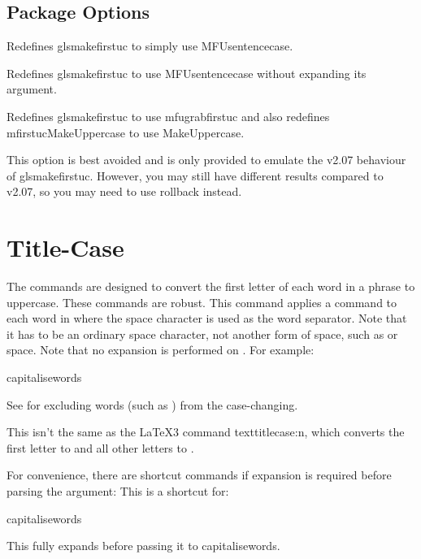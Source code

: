 \documentclass[titlepage=false,oneside,
 fontsize=12pt,captions=tableheading]{scrbook}
\begin{document}
\section{Package Options}
\label{sec:pkgoptions}

Redefines \gls{glsmakefirstuc} to simply use \gls{MFUsentencecase}.

Redefines \gls{glsmakefirstuc} to use \gls{MFUsentencecase}
without expanding its argument.

Redefines \gls{glsmakefirstuc} to use \gls{mfugrabfirstuc} and also
redefines \gls{mfirstucMakeUppercase} to use \gls{MakeUppercase}.

This option is best avoided and is only provided to emulate the v2.07
behaviour of \gls{glsmakefirstuc}. However, you may still have
different results compared to v2.07, so you may need to use rollback
instead.

\chapter{Title-Case}
\label{sec:capitalisewords}

The  commands are designed to convert the first letter of each
word in a phrase to uppercase. These commands are robust.
This command applies a  command to each word in 
where the space character is used as the word separator. Note that
it has to be an ordinary space character, not another form of space,
such as  or \gls{space}. Note that no expansion is performed
on .
For example:
\begin{coderesult}
\gls{capitalisewords}
\tcblower
{}
\end{coderesult}
See  for excluding words (such as )
from the case-changing.

\begin{information}
This isn't the same as the \LaTeX3 command \gls{texttitlecase:n},
which converts the first letter to  and all other
letters to .
\end{information}

For convenience, there are shortcut commands if expansion is
required before parsing the argument:
This is a shortcut for:
\begin{compactcodebox}
\gls{capitalisewords}
\end{compactcodebox}
This fully expands  before passing it to
\gls{capitalisewords}.
\end{document}
